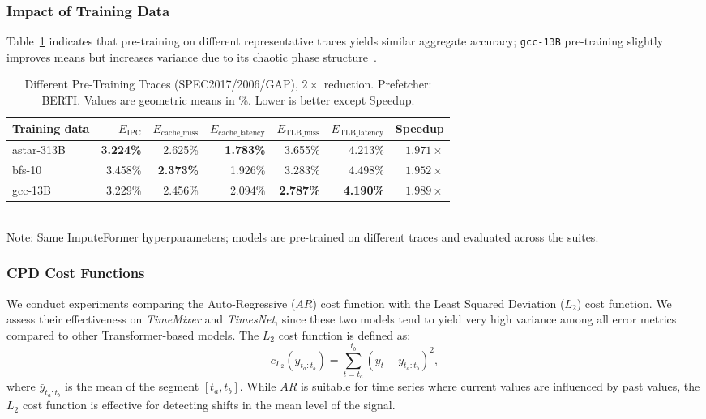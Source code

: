 \documentclass[conference]{IEEEtran}
\begin{document}
\subsubsection*{Impact of Training Data}
Table~\ref{tab:sensitivity_training_onecol} indicates that pre-training on different representative traces yields similar aggregate accuracy; \texttt{gcc-13B} pre-training slightly improves means but increases variance due to its chaotic phase structure~\cite{Shen+:ASPLOS04}. %


\begin{table}[htbp!]
  \caption{Different Pre-Training Traces (SPEC2017/2006/GAP), $2\times$ reduction. Prefetcher: BERTI. Values are geometric means in \%. Lower is better except Speedup.}
  \label{tab:sensitivity_training_onecol}
  \centering
  \setlength{\tabcolsep}{2pt}
  \begin{adjustbox}{max width=1.0\columnwidth}
  \begin{tabular}{l|rrrrrr}
  \toprule
  Training data & ${E}_{\text{IPC}}$  & $E_{\text{cache\_miss}}$  &$E_{\text{cache\_latency}}$  & $E_{\text{TLB\_miss}}$    & $E_{\text{TLB\_latency}}$   & Speedup \\
  \midrule
  astar-313B & \textbf{3.224\%} & 2.625\% & \textbf{1.783\%} & 3.655\% & 4.213\% & $1.971\times$ \\
  bfs-10     & 3.458\% & \textbf{2.373\%} & 1.926\% & 3.283\% & 4.498\% & $1.952\times$ \\
  gcc-13B    & 3.229\% & 2.456\% & 2.094\% & \textbf{2.787\%} & \textbf{4.190\%} & \textbf{$1.989\times$} \\
  \bottomrule
  \end{tabular}
  \end{adjustbox}
  \vspace{0.25ex}
  \\
  \footnotesize Note: Same ImputeFormer hyperparameters; models are pre-trained on different traces and evaluated across the suites.
\end{table}


\subsubsection*{CPD Cost Functions}
We conduct experiments comparing the {Auto-Regressive ($AR$)} cost function with the {Least Squared Deviation ($L_2$)} cost function. We assess their effectiveness on \textit{TimeMixer} and \textit{TimesNet}, since these two models tend to yield very high variance among all error metrics compared to other Transformer-based models. The $L_2$ cost function is defined as: $$c_{\text{$L_2$}}(y_{t_a:t_b}) = \sum_{t = t_a}^{t_b} \left( y_t - \bar{y}_{t_a:t_b} \right)^2,$$
where $\bar{y}_{t_a:t_b}$ is the mean of the segment $[t_a, t_b]$. 
While $AR$ is suitable for time series where current values are influenced by past values, the $L_2$ cost function is effective for detecting shifts in the mean level of the signal\cite{Lavielle2005}.   
\end{document}
